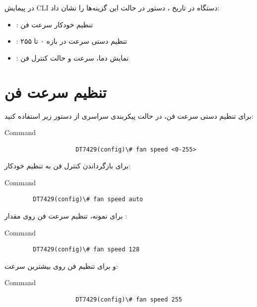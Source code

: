 \documentclass[11pt,letterpaper]{report}
\begin{document}
	در پیمایش CLI دستگاه در تاریخ ، دستور
	 در حالت  این گزینه‌ها را نشان داد:

	\begin{itemize}
		\item {}: تنظیم خودکار سرعت فن
		\item {}: تنظیم دستی سرعت در بازه ۰ تا ۲۵۵
		\item {}: نمایش دما، سرعت و حالت کنترل فن
	\end{itemize}

	\section{تنظیم سرعت فن}

	برای تنظیم دستی سرعت فن، در حالت پیکربندی سراسری از دستور زیر
	استفاده کنید:

	\begin{latin}
		\begin{cliexample}{Command}
			\begin{verbatim}
					DT7429(config)\# fan speed <0-255>
			\end{verbatim}
		\end{cliexample}
	\end{latin}

	برای بازگرداندن کنترل فن به تنظیم خودکار:

	\begin{latin}
		\begin{cliexample}{Command}
			\begin{verbatim}
		DT7429(config)\# fan speed auto
			\end{verbatim}
		\end{cliexample}
	\end{latin}

	برای نمونه، تنظیم سرعت فن روی مقدار :

	\begin{latin}
		\begin{cliexample}{Command}
			\begin{verbatim}
		DT7429(config)\# fan speed 128
			\end{verbatim}
		\end{cliexample}
	\end{latin}

	و برای تنظیم فن روی بیشترین سرعت:

	\begin{latin}
		\begin{cliexample}{Command}
			\begin{verbatim}
					DT7429(config)\# fan speed 255
			\end{verbatim}
		\end{cliexample}
	\end{latin}
\end{document}
